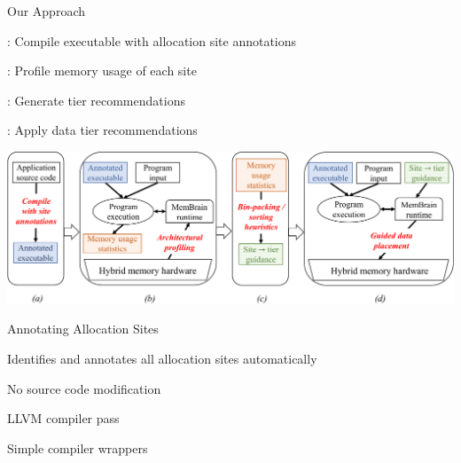 \documentclass[final,hyperref={pdfpagelabels=false}]{beamer}
\begin{document}
\begin{frame}{Our Approach}
  \begin{customlist}{0em}{0em}
    \item {}: Compile executable with allocation site annotations
    \item {}: Profile memory usage of each site
    \item {}: Generate tier recommendations
    \item {}: Apply data tier recommendations
  \end{customlist}
  \vspace{2em}
  \centering
  \includegraphics[width=.85\textwidth]{figures/membrain.pdf}
\end{frame}

\lstset{showspaces=false,showstringspaces=false}%
\begin{frame}{Annotating Allocation Sites}
  \begin{customlist}{0em}{0em}
    \item Identifies and annotates all allocation sites automatically
    \item No source code modification
    \item LLVM compiler pass
    \item Simple compiler wrappers
  \end{customlist}
  \centering
  \vspace{2em}
\end{frame}
\end{document}
